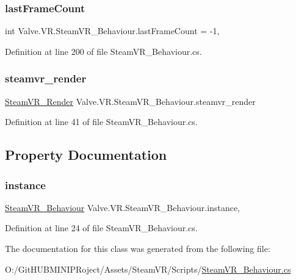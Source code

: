 \subsubsection{\texorpdfstring{lastFrameCount}{lastFrameCount}}
{\footnotesize\ttfamily int Valve.\+V\+R.\+Steam\+V\+R\+\_\+\+Behaviour.\+last\+Frame\+Count = -\/1\hspace{0.3cm}{\ttfamily [static]}, {\ttfamily [protected]}}



Definition at line 200 of file Steam\+V\+R\+\_\+\+Behaviour.\+cs.

\mbox{\label{class_valve_1_1_v_r_1_1_steam_v_r___behaviour_a03d34792871c3e0aa336088e306257dd}} 
\subsubsection{\texorpdfstring{steamvr\_render}{steamvr\_render}}
{\footnotesize\ttfamily \mbox{\hyperlink{class_valve_1_1_v_r_1_1_steam_v_r___render}{Steam\+V\+R\+\_\+\+Render}} Valve.\+V\+R.\+Steam\+V\+R\+\_\+\+Behaviour.\+steamvr\+\_\+render}



Definition at line 41 of file Steam\+V\+R\+\_\+\+Behaviour.\+cs.



\subsection{Property Documentation}
\mbox{\label{class_valve_1_1_v_r_1_1_steam_v_r___behaviour_ac8b8a5b3919713bd071703b1043d97ab}} 
\subsubsection{\texorpdfstring{instance}{instance}}
{\footnotesize\ttfamily \mbox{\hyperlink{class_valve_1_1_v_r_1_1_steam_v_r___behaviour}{Steam\+V\+R\+\_\+\+Behaviour}} Valve.\+V\+R.\+Steam\+V\+R\+\_\+\+Behaviour.\+instance\hspace{0.3cm}{\ttfamily [static]}, {\ttfamily [get]}}



Definition at line 24 of file Steam\+V\+R\+\_\+\+Behaviour.\+cs.



The documentation for this class was generated from the following file\+:\begin{DoxyCompactItemize}
\item 
O\+:/\+Git\+H\+U\+B\+M\+I\+N\+I\+P\+Roject/\+Assets/\+Steam\+V\+R/\+Scripts/\mbox{\hyperlink{_steam_v_r___behaviour_8cs}{Steam\+V\+R\+\_\+\+Behaviour.\+cs}}\end{DoxyCompactItemize}

